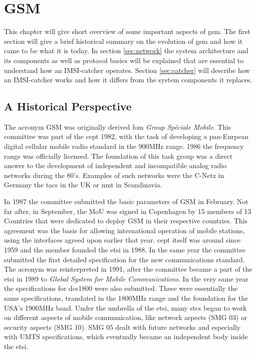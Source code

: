 \chapter{GSM}
\label{ch:gsm}
This chapter will give short overview of some important aspects of \gls{gsm}.
The first section will give a brief historical summary on the evolution of \gls{gsm} and how it came to be what it is today.
In section \ref{sec:network} the system architecture and its components as well as protocol basics will be explained that are essential to understand how an IMSI-catcher operates.
Section \ref{sec:catcher} will describe how an IMSI-catcher works and how it differs from the system components it replaces.
 
\section{A Historical Perspective}
The acronym GSM was originally derived fom \emph{Group Sp\'{e}ciale Mobile}.
This committee was part of the \gls{cept} 1982, with the task of developing a pan-Eurpean digital cellular mobile radio standard in the 900MHz range.
1986 the frequency range was officially licensed.
The foundation of this task group was a direct answer to the development of independent and incompatible analog radio networks during the 80's.
Examples of such networks were the C-Netz in Germany the \gls{tacs} in the UK or \gls{nmt} in Scandinavia.

In 1987 the committee submitted the basic parameters of GSM in February. 
Not far after, in September, the \gls{MoU} was signed in Copenhagen by 15 members of 13 Countries that were dedicated to deploy GSM in their respective countries.
This agreement was the basis for allowing international operation of mobile stations, using the interfaces agreed upon earlier that year.
\gls{cept} itself was around since 1959 and the member founded the \gls{etsi} in 1988.
In the same year the committee submitted the first detailed specification for the new communications standard.
The acronym was reinterpreted in 1991, after the committee became a part of the \gls{etsi} in 1989 to \emph{Global System for Mobile Communications}.
In the very same year the specifications for \gls{dcs1800} were also submitted.
These were essentially the same specifications, translated in the 1800MHz range and the foundation for the USA's 1900MHz band.
Under the umbrella of the \gls{etsi}, many \gls{stc}s began to work on different aspects of mobile communication, like network aspects (SMG 03) or security aspects (SMG 10).
SMG 05 dealt with future networks and especially with UMTS specifications, which eventually became an independent body inside the \gls{etsi}.

